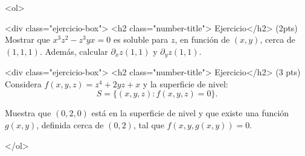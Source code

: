 \documentclass[12pt]{article}
\begin{document}
\bigskip

            
\bigskip
\bigskip
\bigskip






<ol>

<div class="ejercicio-box"> <h2 class="number-title"> Ejercicio</h2> (2pts) Mostrar que $x^3z^2-z^3yx=0$ es soluble para $z$, en función
  de $(x,y)$, cerca de $(1,1,1)$. Además, calcular $\partial_xz(1,1)$
  y $\partial_yz(1,1)$.

\vspace{5cm}


<div class="ejercicio-box"> <h2 class="number-title"> Ejercicio</h2> (3 pts) Considera $f(x,y,z)=z^4+2yz+x$ y la superficie de nivel:
$$
S=\{(x,y,z): f(x,y,z)=0\}.
$$

Muestra que $(0,2,0)$ está en la superficie de nivel y que existe
una función $g(x,y)$, definida cerca de $(0,2)$, tal que $f(x,y,g(x,y))=0$.


</ol>
 





  
\end{document}
